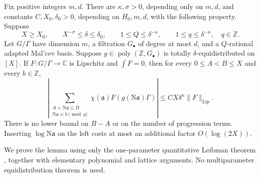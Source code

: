 \begin{lemma}\label{lem:gn-norm-transfer}
Fix positive integers $m,d$. There are $\kappa,\sigma>0$, depending only
on $m,d$, and constants $C,X_0,\delta_0>0$, depending on $H_0,m,d$, with
the following property. Suppose
\[
 X\geq X_0,\qquad X^{-\sigma}\leq\delta\leq\delta_0,
 \qquad 1\leq Q\leq\delta^{-\kappa},\qquad
 1\leq q\leq\delta^{-\kappa},\quad q\in\mathbb Z.
\]
Let $G/\Gamma$ have dimension $m$, a filtration $G_\bullet$ of degree at
most $d$, and a $Q$-rational adapted Mal'cev basis. Suppose
$g\in\operatorname{poly}(\mathbb Z,G_\bullet)$ is totally
$\delta$-equidistributed on $[X]$. If $F:G/\Gamma\to\mathbb C$ is
Lipschitz and $\int F=0$, then for every $0\leq A<B\leq X$ and every
$b\in\mathbb Z$,
\begin{equation}\label{eq:gn-transfer}
 \left|\sum_{\substack{A<\mathrm N\mathfrak a\leq B\\
                 \mathrm N\mathfrak a\equiv b\pmod q}}
       \chi(\mathfrak a)F(g(\mathrm N\mathfrak a)\Gamma)\right|
 \leq C X\delta^\kappa\|F\|_{\mathrm{Lip}}.
\end{equation}
There is no lower bound on $B-A$ or on the number of progression terms.
Inserting $\log\mathrm N\mathfrak a$ on the left costs at most an
additional factor $O(\log(2X))$.
\end{lemma}

We prove the lemma using only the one-parameter quantitative Leibman
theorem \cite[Theorem 2.9]{GTOrbits2012}, together with elementary
polynomial and lattice arguments. No multiparameter equidistribution
theorem is used.

